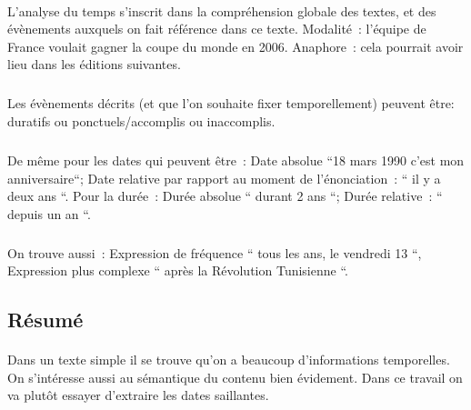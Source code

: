 \paragraph{}
L’analyse du temps s’inscrit dans la compréhension globale des textes, et des évènements auxquels on fait référence dans ce texte. 
\newline
Modalité~: l’équipe de France voulait gagner la coupe du monde en 2006. 
\newline
Anaphore~: cela pourrait avoir lieu dans les éditions suivantes.
\subparagraph{}
Les évènements décrits (et que l’on souhaite fixer temporellement) peuvent être: duratifs ou ponctuels/accomplis ou inaccomplis. 
\subparagraph{}
De même pour les dates qui peuvent être~: Date absolue ``18 mars 1990 c'est mon anniversaire``; Date relative par rapport au moment de l’énonciation~: `` il y a deux ans ``. Pour la durée~: Durée absolue `` durant 2 ans ``; Durée relative~: `` depuis un an ``.
\subparagraph{}
On trouve aussi~: Expression de fréquence `` tous les ans, le vendredi 13 ``, Expression plus complexe `` après la Révolution Tunisienne ``.
\subsection*{Résumé}
\paragraph{}
Dans un texte simple il se trouve qu’on a beaucoup d’informations temporelles. On s'intéresse aussi au sémantique du contenu bien évidement. Dans ce travail on va plutôt essayer d’extraire les dates saillantes.








